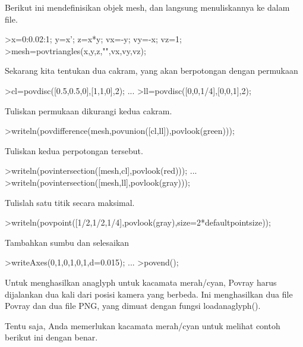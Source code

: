 \documentclass{article}
\begin{document}
\begin{eulernotebook}
\begin{eulercomment}
\begin{eulercomment}
\begin{eulercomment}
Berikut ini mendefinisikan objek mesh, dan langsung menuliskannya ke
dalam file.
\end{eulercomment}
\begin{eulerprompt}
>x=0:0.02:1; y=x'; z=x*y; vx=-y; vy=-x; vz=1;
>mesh=povtriangles(x,y,z,"",vx,vy,vz);
\end{eulerprompt}
\begin{eulercomment}
Sekarang kita tentukan dua cakram, yang akan berpotongan dengan
permukaan
\end{eulercomment}
\begin{eulerprompt}
>cl=povdisc([0.5,0.5,0],[1,1,0],2); ...
>ll=povdisc([0,0,1/4],[0,0,1],2);
\end{eulerprompt}
\begin{eulercomment}
Tuliskan permukaan dikurangi kedua cakram.
\end{eulercomment}
\begin{eulerprompt}
>writeln(povdifference(mesh,povunion([cl,ll]),povlook(green)));
\end{eulerprompt}
\begin{eulercomment}
Tuliskan kedua perpotongan tersebut.
\end{eulercomment}
\begin{eulerprompt}
>writeln(povintersection([mesh,cl],povlook(red))); ...
>writeln(povintersection([mesh,ll],povlook(gray)));
\end{eulerprompt}
\begin{eulercomment}
Tulislah satu titik secara maksimal.
\end{eulercomment}
\begin{eulerprompt}
>writeln(povpoint([1/2,1/2,1/4],povlook(gray),size=2*defaultpointsize));
\end{eulerprompt}
\begin{eulercomment}
Tambahkan sumbu dan selesaikan
\end{eulercomment}
\begin{eulerprompt}
>writeAxes(0,1,0,1,0,1,d=0.015); ...
>povend();
\end{eulerprompt}
\begin{eulercomment}
Untuk menghasilkan anaglyph untuk kacamata merah/cyan, Povray harus
dijalankan dua kali dari posisi kamera yang berbeda. Ini menghasilkan
dua file Povray dan dua file PNG, yang dimuat dengan fungsi
loadanaglyph().

Tentu saja, Anda memerlukan kacamata merah/cyan untuk melihat contoh
berikut ini dengan benar. 


\end{eulercomment}
\end{eulercomment}
\end{eulercomment}
\end{eulernotebook}
\end{document}
